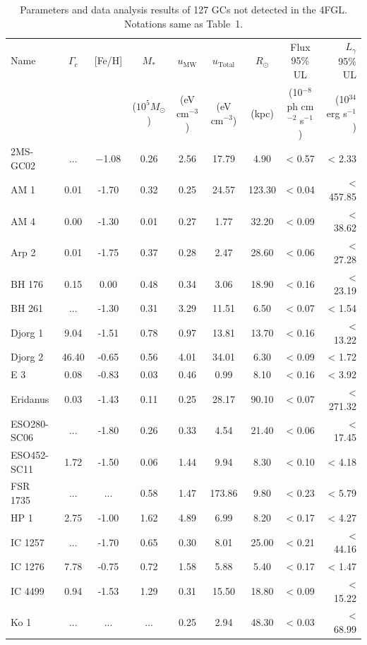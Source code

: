 \documentclass[doublespace,nopageskip]{VTthesis} %
\begin{document}
\begin{appendices}
\begin{table}
\centering
\caption{Parameters and data analysis results of 127 GCs not detected in the 4FGL. Notations same as Table~1.}\label{tab:nondetect}
\begin{tabular}{lcccccccr}
\hline
Name &  $\Gamma_c$& [Fe/H]  & $M_*$ & $u_\text{MW}$ & $u_\text{Total}$ & $R_\odot$ & Flux 95\% UL & $L_\gamma$ 95\% UL \\
 & &  & ($10^5 M_\odot$) & (eV cm$^{-3}$) & (eV cm$^{-3}$) & (kpc) & (10$^{-8}$ ph cm$^{-2}$ s$^{-1}$)  & (10$^{34}$ erg s$^{-1}$)\\
\hline
2MS-GC02 & ... & $-$1.08 & 0.26 & 2.56 & 17.79 & 4.90 & < 0.57 & < 2.33\\
AM 1 & 0.01 & -1.70 & 0.32 & 0.25 & 24.57 & 123.30 & < 0.04 & < 457.85\\
AM 4 & 0.00 & -1.30 & 0.01 & 0.27 & 1.77 & 32.20 & < 0.09 & < 38.62\\
Arp 2 & 0.01 & -1.75 & 0.37 & 0.28 & 2.47 & 28.60 & < 0.06 & < 27.28\\
BH 176 & 0.15 & 0.00 & 0.48 & 0.34 & 3.06 & 18.90 & < 0.16 & < 23.19\\
BH 261 & ... & -1.30 & 0.31 & 3.29 & 11.51 & 6.50 & < 0.07 & < 1.54\\
Djorg 1 & 9.04 & -1.51 & 0.78 & 0.97 & 13.81 & 13.70 & < 0.16 & < 13.22\\
Djorg 2 & 46.40 & -0.65 & 0.56 & 4.01 & 34.01 & 6.30 & < 0.09 & < 1.72\\
E 3 & 0.08 & -0.83 & 0.03 & 0.46 & 0.99 & 8.10 & < 0.16 & < 3.92\\
Eridanus & 0.03 & -1.43 & 0.11 & 0.25 & 28.17 & 90.10 & < 0.07 & < 271.32\\
ESO280-SC06 & ... & -1.80 & 0.26 & 0.33 & 4.54 & 21.40 & < 0.06 & < 17.45\\
ESO452-SC11 & 1.72 & -1.50 & 0.06 & 1.44 & 9.94 & 8.30 & < 0.10 & < 4.18\\
FSR 1735 & ... & ... & 0.58 & 1.47 & 173.86 & 9.80 & < 0.23 & < 5.79\\
HP 1 & 2.75 & -1.00 & 1.62 & 4.89 & 6.99 & 8.20 & < 0.17 & < 4.27\\
IC 1257 & ... & -1.70 & 0.65 & 0.30 & 8.01 & 25.00 & < 0.21 & < 44.16\\
IC 1276 & 7.78 & -0.75 & 0.72 & 1.58 & 5.88 & 5.40 & < 0.17 & < 1.47\\
IC 4499 & 0.94 & -1.53 & 1.29 & 0.31 & 15.50 & 18.80 & < 0.09 & < 15.22\\
Ko 1 & ... & ... & ... & 0.25 & 2.94 & 48.30 & < 0.03 & < 68.99\\

\end{tabular}
\end{table}
\end{appendices}
\end{document}
